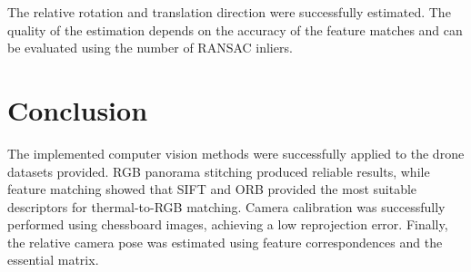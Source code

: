 The relative rotation and translation direction were successfully estimated. The quality of the estimation depends on the accuracy of the feature matches and can be evaluated using the number of RANSAC inliers.


\section{Conclusion}

The implemented computer vision methods were successfully applied to the drone datasets provided. RGB panorama stitching produced reliable results, while feature matching showed that SIFT and ORB provided the most suitable descriptors for thermal-to-RGB matching. Camera calibration was successfully performed using chessboard images, achieving a low reprojection error. Finally, the relative camera pose was estimated using feature correspondences and the essential matrix.